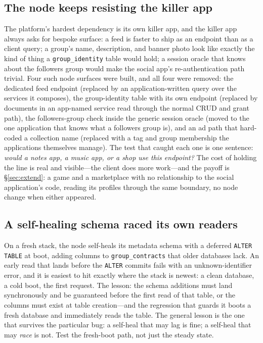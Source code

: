\documentclass[sigconf, nonacm]{acmart}
\begin{document}
\subsection{The node keeps resisting the killer app}

The platform's hardest dependency is its own killer app, and the killer
app always asks for bespoke surface: a feed is faster to ship as an
endpoint than as a client query; a group's name, description, and banner
photo look like exactly the kind of thing a \texttt{group\_identity}
table would hold; a session oracle that knows about the followers group
would make the social app's re-authentication path trivial. Four such
node surfaces were built, and all four were removed: the dedicated feed
endpoint (replaced by an application-written query over the services it
composes), the group-identity table with its own endpoint (replaced by
documents in an app-named service read through the normal CRUD and grant
path), the followers-group check inside the generic session oracle
(moved to the one application that knows what a followers group is),
and an ad path that hard-coded a collection name (replaced with a tag
and group membership the applications themselves manage). The test that
caught each one is one sentence: \emph{would a notes app, a music app,
or a shop use this endpoint?} The cost of holding the line is real and
visible---the client does more work---and the payoff is
\S\ref{sec:extend}: a game and a marketplace with no relationship to
the social application's code, reading its profiles through the same
boundary, no node change when either appeared.

\subsection{A self-healing schema raced its own readers}

On a fresh stack, the node self-heals its metadata schema with a
deferred \texttt{ALTER TABLE} at boot, adding columns to
\texttt{group\_contracts} that older databases lack. An early read that
lands before the \texttt{ALTER} commits fails with an
unknown-identifier error, and it is easiest to hit exactly where the
stack is newest: a clean database, a cold boot, the first request.
The lesson: the schema additions must land synchronously and be
guaranteed before the first read of that table, or the columns must
exist at table creation---and the regression that guards it boots a
fresh database and immediately reads the table. The
general lesson is the one that survives the particular bug: a
self-heal that may lag is fine; a self-heal that may \emph{race} is
not. Test the fresh-boot path, not just the steady state.
\end{document}
